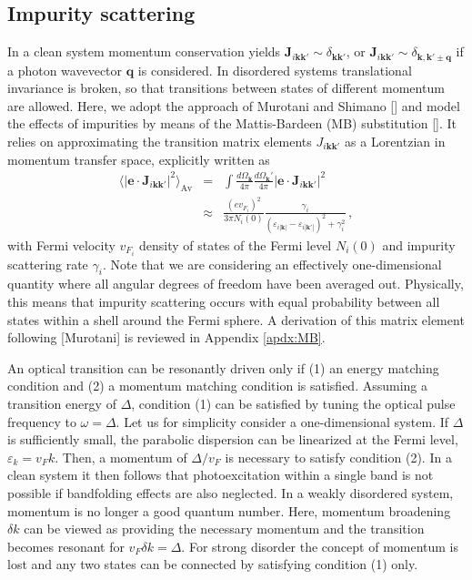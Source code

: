 \documentclass[aps,prb,reprint,noeprint,superscriptaddress]{revtex4-1}
\begin{document}
\subsection{Impurity scattering}
\label{sec:MB}
In a clean system momentum conservation yields $\mathbf{J}_{i\mathbf{kk'}} \sim
\delta_{\mathbf{kk'}}$, or $\mathbf{J}_{i\mathbf{kk'}} \sim
\delta_{\mathbf{k,k'}\pm\mathbf{q}}$ if a photon wavevector $\mathbf{q}$ is
considered. In disordered systems translational invariance is broken, so that
transitions between states of different momentum are allowed. Here, we adopt the
approach of Murotani and Shimano [] and model the effects of impurities by
means of the Mattis-Bardeen (MB) substitution []. It relies on approximating the
transition matrix elements $J_{i\mathbf{kk'}}$ as a
Lorentzian in momentum transfer space, explicitly written as
\begin{eqnarray}
	\langle \left|\mathbf{e} \cdot
	\mathbf{J}_{i\mathbf{kk'}}\right|^2\rangle_{\text{Av}}
	&=& \int \frac{d\Omega_\mathbf{k}}{4\pi} \frac{d\Omega_\mathbf{k}'}{4\pi}
	\left|\mathbf{e} \cdot \mathbf{J}_{i\mathbf{kk'}}\right|^2
	\\
	&\approx& \frac{(e v_{F_i})^2}{3 \pi N_i(0)} 
	\frac{\gamma_i}{\left(\varepsilon_{i|\mathbf{k}|}-\varepsilon_{i|\mathbf{k}'|}\right)^2
	+ \gamma_i^2} \,,
	\label{eq:MB}
\end{eqnarray}
with Fermi velocity $v_{F_i}$ density of states of the Fermi level $N_i(0)$ and
impurity scattering rate $\gamma_i$. Note that we are considering an effectively
one-dimensional quantity
where all angular degrees of freedom have been averaged out.
Physically, this means that impurity scattering occurs with equal probability
between all states within a shell around the Fermi sphere.
A derivation of this matrix element
following [Murotani] is reviewed in Appendix \ref{apdx:MB}.

An optical transition can be resonantly driven only if (1) an energy matching
condition and (2) a momentum 
matching condition is satisfied. Assuming a transition energy of $\Delta$,
condition
(1) can be satisfied by tuning the optical pulse frequency to $\omega=\Delta$.
Let us for simplicity consider a one-dimensional system. If
$\Delta$ is sufficiently small, the parabolic dispersion can be linearized at
the Fermi level, $\varepsilon_k = v_F k$. Then, a momentum of $\Delta/v_F$ 
is necessary to satisfy condition (2). In a clean system it then follows that
photoexcitation within a single band is not possible
if bandfolding effects are also neglected.
In a weakly disordered system, momentum is no longer a good quantum
number. Here, momentum broadening $\delta k$ can be viewed as providing the necessary
momentum and the transition becomes resonant for $v_F \delta k=\Delta$. For
strong disorder the concept of momentum is lost and any two states
can be connected by satisfying condition (1) only.
\end{document}
